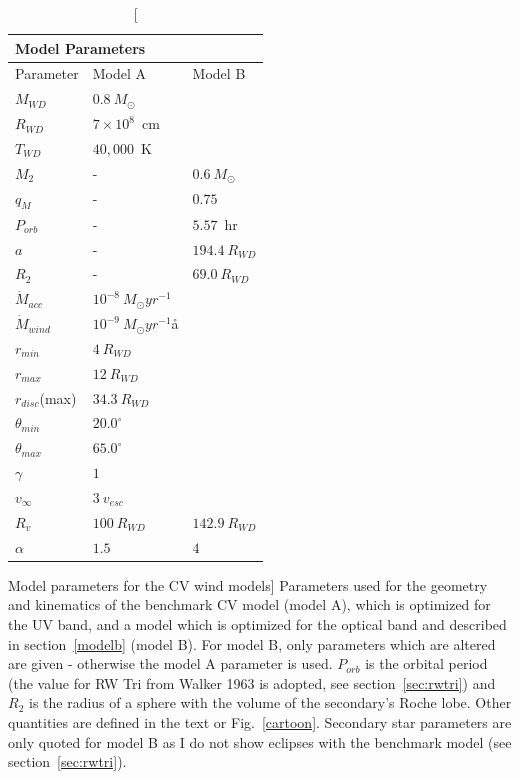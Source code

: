 \begin{table}
\centering
\begin{tabular}{p{2cm}p{2cm}p{2cm}}
\multicolumn{2}{|l|}{Model Parameters}  \\
\hline Parameter 	&	 Model A  & Model B \\ 
\hline \hline 
$M_{WD}$ 	 &	 $0.8~M_{\odot}$  &     \\ 
$R_{WD}$ 	 &	 $7\times10^{8}$~cm  & \\ 
$T_{WD}$ 	 &	 $40,000$~K        &  \\
$M_{2}$ 	& -&	 $0.6~M_{\odot}$   \\ 
$q_M$ 	&- &	 $0.75$   \\ 
$P_{orb}$ 	&- &	 $5.57$~hr   \\ 
$a$ 	& -&	 $194.4~R_{WD}$   \\ 
$R_2$   &   -  &	 $69.0~R_{WD}$  \\ 
$\dot{M}_{acc}$ 	 &	 $10^{-8}~M_{\odot}yr^{-1}$  &\\ 
$\dot{M}_{wind}$  &	$10^{-9}~M_{\odot}yr^{-1}$å  & \\ 
$r_{min}$ 	&	 $4~R_{WD}$ &  \\ 
$r_{max}$ 	&	 $12~R_{WD}$  &  \\ 
$r_{disc}$(max) 	&	 $34.3~R_{WD}$  &  \\ 
$\theta_{min}$ 	&	 $20.0^{\circ}$  &  \\ 
$\theta_{max}$ 	&	 $65.0^{\circ}$  &  \\ 
$\gamma$ 	&	 $1$  &  \\ 
$v_{\infty}$ 	&	 $3~v_{esc}$  &  \\ 
$R_v$ 	        &	 $100~R_{WD}$  &  $142.9~R_{WD}$  \\ 
$\alpha$ 	&	 $1.5$   &   $4$\\
\end{tabular}
\centering
\caption
[Model parameters for the CV wind models]
{
Parameters used for the geometry and kinematics of the benchmark 
CV model (model A), which is optimized for the UV band, and a model
which is optimized for the optical band and described in section~\ref{modelb} (model B).
For model B, only parameters which are altered are given - otherwise the
model A parameter is used. $P_{orb}$ is the orbital period 
(the value for RW Tri from Walker 1963 is adopted, see section~\ref{sec:rwtri}) and 
$R_2$ is the radius of a sphere with the volume of the secondary's Roche lobe. 
Other quantities are defined in the text or Fig.~\ref{cartoon}.
Secondary star parameters are only quoted for 
model B as I do not show eclipses with the 
benchmark model (see section~\ref{sec:rwtri}).
}
\label{wind_param}
\label{modelb_table}
\end{table}

